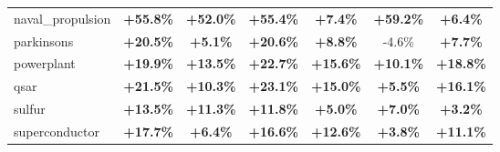 \begin{table}[!htbp]
{\begin{tabular}{lcccccc}
naval\_propulsion & \textbf{+55.8\%} & \textbf{+52.0\%} & \textbf{+55.4\%} & \textbf{+7.4\%} & \textbf{+59.2\%} & \textbf{+6.4\%} \\
parkinsons & \textbf{+20.5\%} & \textbf{+5.1\%} & \textbf{+20.6\%} & \textbf{+8.8\%} & -4.6\% & \textbf{+7.7\%} \\
powerplant & \textbf{+19.9\%} & \textbf{+13.5\%} & \textbf{+22.7\%} & \textbf{+15.6\%} & \textbf{+10.1\%} & \textbf{+18.8\%} \\
qsar & \textbf{+21.5\%} & \textbf{+10.3\%} & \textbf{+23.1\%} & \textbf{+15.0\%} & \textbf{+5.5\%} & \textbf{+16.1\%} \\
sulfur & \textbf{+13.5\%} & \textbf{+11.3\%} & \textbf{+11.8\%} & \textbf{+5.0\%} & \textbf{+7.0\%} & \textbf{+3.2\%} \\
superconductor & \textbf{+17.7\%} & \textbf{+6.4\%} & \textbf{+16.6\%} & \textbf{+12.6\%} & \textbf{+3.8\%} & \textbf{+11.1\%} \\
\bottomrule
\end{tabular}%
}
\end{table}